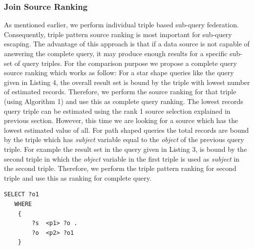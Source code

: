 \documentclass{sig-alternate}  %
\begin{document}
\subsubsection{Join Source Ranking}
 As mentioned earlier, we perform individual triple based sub-query federation. Consequently, triple pattern source ranking is most important for sub-query escaping. The advantage of this approach is that if a data source is not capable of answering the complete query, it may produce enough results for a specific sub-set of query triples. For the comparison purpose we propose a complete query source ranking which works as follow: For a star shape queries like the query given in Listing 4, the overall result set is bound by the triple with lowest number of estimated records. Therefore, we perform the source ranking for that triple (using Algorithm 1) and use this as complete query ranking. The lowest records query triple can be estimated using the rank 1 source selection explained in previous section. However, this time we are looking for a source which has the lowest estimated value of all. For path shaped queries the total records are bound by the triple which has \emph{subject} variable equal to the \emph{object} of the previous query triple. For example the result set in the query given in Listing 3, is bound by the second triple in which the \emph{object} variable in the first triple is used as \emph{subject} in the second triple. Therefore, we perform the triple pattern ranking for second triple and use this as ranking for complete query.
\begin{lstlisting}[caption = {A P-1 query example},basicstyle={\tiny},frame = {single},language=SPARQL,stringstyle={\ttfamily}]
 SELECT ?o1 
   WHERE
    {
        ?s  <p1> ?o .
        ?o  <p2> ?o1
    }
\end{lstlisting}
\end{document}
